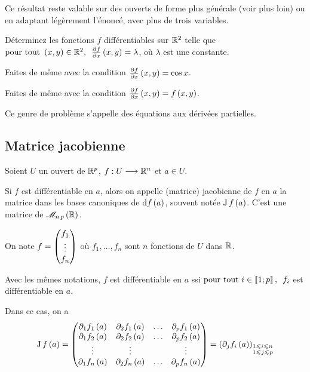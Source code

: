 \begin{rem}
Ce résultat reste valable sur des ouverts de forme plus générale (voir plus loin) ou en adaptant légèrement l'énoncé, avec plus de trois variables.
\end{rem}

\begin{exo}
Déterminez les fonctions \(f\) différentiables sur \(\mathbb{R}^2\) telle que \(\quantifs{\tpt\paren{x,y}\in\R^2}\pdv{f}{x}\paren{x,y}=\lambda\), où \(\lambda\) est une constante.
\end{exo}

\begin{exo}
Faites de même avec la condition \(\pdv{f}{x}\left(x,y\right)=\cos x\).
\end{exo}

\begin{exo}
Faites de même avec la condition \(\pdv{f}{x}\left(x,y\right)=f\left(x,y\right)\).
\end{exo}

Ce genre de problème s'appelle des équations aux dérivées partielles.

\subsection{Matrice jacobienne}

\begin{defi}
Soient \(U\) un ouvert de \(\mathbb{R}^p\), \(f:U\longrightarrow\mathbb{R}^n\) et \(a\in U\).

Si \(f\) est différentiable en \(a\), alors on appelle (matrice) jacobienne de \(f\) en \(a\) la matrice dans les bases canoniques de \(\odif{f}\paren{a}\), souvent notée \(\operatorname{J}f\left(a\right)\). C'est une matrice de \(\M{n\,p}[\R]\).
\end{defi}

On note \(f=\begin{pmatrix}f_1\\\vdots\\f_n\end{pmatrix}\) où \(f_1,\dots,f_n\) sont \(n\) fonctions de \(U\) dans \(\mathbb{R}\).

\begin{prop}
Avec les mêmes notations, \(f\) est différentiable en \(a\) ssi \(\quantifs{\tpt i\in\interventierii{1}{p}}f_i\) est différentiable en \(a\).
\end{prop}

Dans ce cas, on a \[\jacobienne{f}\paren{a}=\begin{pmatrix}
\pdif{1}f_1\paren{a} & \pdif{2}f_1\paren{a} & \dots & \pdif{p}f_1\paren{a} \\
\pdif{1}f_2\paren{a} & \pdif{2}f_2\paren{a} & \dots & \pdif{p}f_2\paren{a} \\
\vdots & \vdots &  & \vdots \\
\pdif{1}f_n\paren{a} & \pdif{2}f_n\paren{a} & \dots & \pdif{p}f_n\paren{a}
\end{pmatrix}=\paren{\pdif{j}f_i\paren{a}}_{\substack{1\leq i\leq n \\ 1\leq j\leq p}}\]

